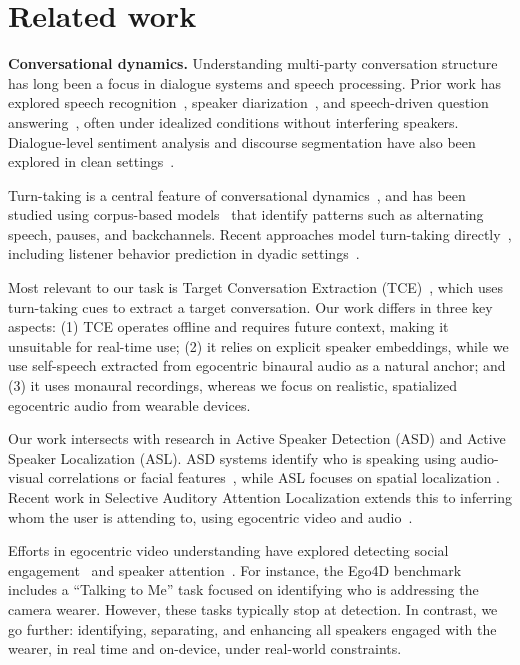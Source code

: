 
\section{Related work}



\noindent\textbf{Conversational dynamics.} 
Understanding multi-party conversation structure has long been a focus in dialogue systems and speech processing. Prior work has explored speech recognition~\cite{asr4conversation}, speaker diarization~\cite{diarization4conversation}, and speech-driven question answering~\cite{qa4conversation}, often under idealized conditions without interfering speakers. Dialogue-level sentiment analysis and discourse segmentation have also been explored in clean settings~\cite{sa4conversation, sdu4conversation}.

Turn-taking is a central feature of conversational dynamics~\cite{frontiers}, and has been studied using corpus-based models~\cite{turntake1, turntake2, turntake3} that identify patterns such as alternating speech, pauses, and backchannels. Recent approaches model turn-taking directly~\cite{turn_model,  turn_predict,nguyen-etal-2025-spirit}, including listener behavior prediction in dyadic settings~\cite{9879511}.


Most relevant to our task is Target Conversation Extraction (TCE)~\cite{tce}, which uses turn-taking cues to extract a target conversation. Our work differs in three key aspects: (1) TCE operates offline and requires future context, making it unsuitable for real-time use; (2) it relies on explicit speaker embeddings, while we use self-speech extracted from egocentric binaural audio as a natural anchor; and (3) it uses monaural recordings, whereas we focus on realistic, spatialized egocentric audio from wearable devices.






 
\vskip 0.02in   Our work intersects with research in Active Speaker Detection (ASD) and Active Speaker Localization (ASL). ASD systems identify who is speaking using audio-visual correlations or facial features~\cite{1544886}, while ASL  focuses on spatial localization \cite{8578556, 9879100, easycom}. Recent work in Selective Auditory Attention Localization extends this to inferring whom the user is attending to, using egocentric video and audio~\cite{10203787, 10447323}.

Efforts in egocentric video understanding have explored detecting social engagement~\cite{6247805} and speaker attention~\cite{ego4d}. For instance, the Ego4D benchmark includes a ``Talking to Me'' task focused on identifying who is addressing the camera wearer. However, these tasks typically stop at detection. In contrast, we go further: identifying, separating, and enhancing all speakers engaged with the wearer, in real time and on-device, under real-world constraints.



